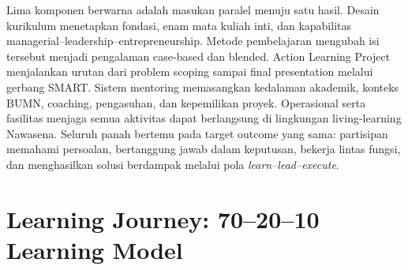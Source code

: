 \begin{center}
\end{center}

\begin{visualexplanation}
Lima komponen berwarna adalah masukan paralel menuju satu hasil. Desain kurikulum menetapkan fondasi, enam mata kuliah inti, dan kapabilitas managerial--leadership--entrepreneurship. Metode pembelajaran mengubah isi tersebut menjadi pengalaman case-based dan blended. Action Learning Project menjalankan urutan dari problem scoping sampai final presentation melalui gerbang SMART. Sistem mentoring memasangkan kedalaman akademik, konteks BUMN, coaching, pengasuhan, dan kepemilikan proyek. Operasional serta fasilitas menjaga semua aktivitas dapat berlangsung di lingkungan living-learning Nawasena. Seluruh panah bertemu pada target outcome yang sama: partisipan memahami persoalan, bertanggung jawab dalam keputusan, bekerja lintas fungsi, dan menghasilkan solusi berdampak melalui pola \textit{learn--lead--execute}.
\end{visualexplanation}

\section{Learning Journey: 70--20--10 Learning Model}
